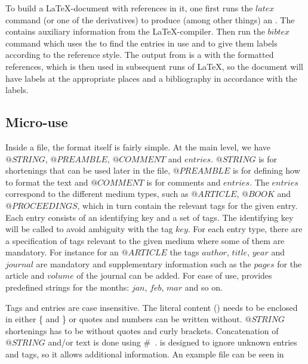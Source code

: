 To build a {\LaTeX}-document with {\bibtex} references in it, one
first runs the $latex$ command (or one of the derivatives) to produce
(among other things) an .  The  contains auxiliary
information from the {\LaTeX}-compiler.  Then run the $bibtex$ command
which uses the  to find the entries in use and to give them
labels according to the reference style.  The output from {\bibtex} is
a  with the formatted references, which is then used in
subsequent runs of {\LaTeX}, so the document will have labels at the
appropriate places and a bibliography in accordance with the labels.


\subsection{Micro-use}

Inside a {\bibtex} file, the format itself is fairly simple. At the
main level, we have $@STRING$, $@PREAMBLE$, $@COMMENT$ and $entries$.
$@STRING$ is for shortenings that can be used later in the {\bibtex}
file, $@PREAMBLE$ is for defining how to format the text and
$@COMMENT$ is for comments and $entries$.  The $entries$ correspond to
the different medium types, such as $@ARTICLE$, $@BOOK$ and
$@PROCEEDINGS$, which in turn contain the relevant tags for the given
entry.  Each entry consists of an identifying key and a set of tags.
The identifying key will be called  to avoid
ambiguity with the tag $key$.  For each entry type, there are a
specification of tags relevant to the given medium where some of them
are mandatory. For instance for an $@ARTICLE$ the tags $author$,
$title$, $year$ and $journal$ are mandatory and supplementary
information such as the $pages$ for the article and $volume$ of the
journal can be added.  For ease of use, {\bibtex} provides predefined
strings for the months: $jan$, $feb$, $mar$ and so on.

Tags and entries are case insensitive. The literal content
() needs to be enclosed in either \{ and \} or quotes and
numbers can be written without.  $@STRING$ shortenings has to be
without quotes and curly brackets.  Concatenation of $@STRING$ and/or
text is done using \#~\cite{bibtex_resource}.  {\bibtex} is designed
to ignore unknown entries and tags, so it allows additional
information.  An example {\bibtex} file can be seen in

